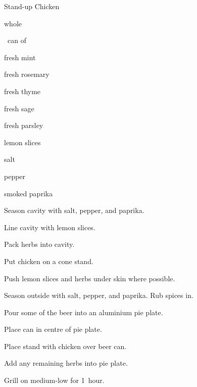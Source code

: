 \begin{recipe}{Stand-up Chicken}{}{}

\begin{ingredients}
\item whole 
\item \half~can of 
\item fresh mint
\item fresh rosemary
\item fresh thyme
\item fresh sage
\item fresh parsley
\item lemon slices
\item salt
\item pepper
\item smoked paprika
\end{ingredients}

\begin{directions}
\item Season cavity with salt, pepper, and paprika.
\item Line cavity with lemon slices.
\item Pack herbs into cavity.
\item Put chicken on a cone stand.
\item Push lemon slices and herbs under skin where possible.
\item Season outside with salt, pepper, and paprika. Rub spices in.
\item Pour some of the beer into an aluminium pie plate.
\item Place can in centre of pie plate.
\item Place stand with chicken over beer can.
\item Add any remaining herbs into pie plate.
\item Grill on medium-low for 1~hour.
\end{directions}

\end{recipe}
